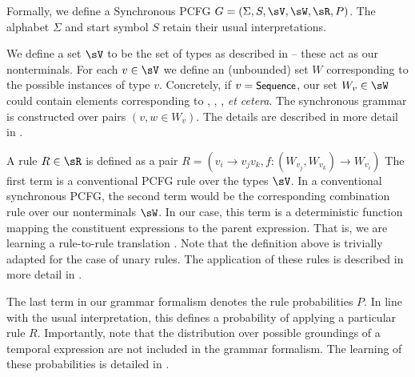 Formally, we define a Synchronous PCFG 
	$G = \left(\Sigma,S,\sV,\sW,\sR,P\right)$.
The alphabet $\Sigma$ and start symbol $S$ retain their usual interpretations.

We define a set $\sV$ to be the set of types as described in
	 -- these act as our nonterminals.
For each $v \in \sV$ we define an (unbounded) set $W$ corresponding to the 
	possible instances of type $v$.
Concretely, if $v=\textsf{\small{Sequence}}$, our set $W_v \in \sW$ could contain elements
	corresponding to , , ,
	\textit{et cetera}.
The synchronous grammar is constructed over pairs $(v,w \in W_v)$.
The details are described in more detail in .

A rule $R \in \sR$ is defined as a pair 
	$R = \left(v_i \rightarrow v_jv_k, 
		f : (W_{v_j},W_{v_k}) \rightarrow W_{v_i}\right)$
The first term is a conventional PCFG rule over the types
	$\sV$.
In a conventional synchronous PCFG, the second term would be the corresponding
	combination rule over our nonterminals $\sW$.
In our case, this term is a deterministic function mapping the
	constituent expressions to the parent expression.
That is, we are learning a rule-to-rule translation 
	\cite{key:1976bach-semantics}.
Note that the definition above is trivially adapted for the case of unary
	rules.
The application of these rules is described in more detail in 
	.

The last term in our grammar formalism denotes the rule probabilities $P$.
In line with the usual interpretation, this defines a probability
	of applying a particular rule $R$.
Importantly, note that the distribution over possible groundings
	of a temporal expression are not included in the grammar
	formalism.
The learning of these probabilities is detailed in .



